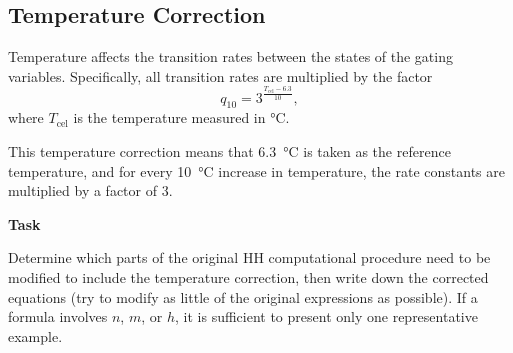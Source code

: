 \documentclass{article}
\begin{document}
\clearpage
\subsection{Temperature Correction}

Temperature affects the transition rates between the states of
the gating variables. Specifically, all transition rates are multiplied
by the factor
\[
q_{10}=3^{\frac{T_{\text{cel}}-6.3}{10}},
\]
where $T_{\text{cel}}$ is the temperature measured in \si{\degreeCelsius}.

This temperature correction means that \SI{6.3}{\degreeCelsius}
is taken as the reference temperature, and for every
\SI{10}{\degreeCelsius} increase in temperature,
the rate constants are multiplied by a factor of 3.

\textbf{Task}

Determine which parts of the original HH computational procedure
need to be modified to include the temperature correction, then write down the corrected equations (try to modify as little of the
original expressions as possible). If a formula involves $n$, $m$,
or $h$, it is sufficient to present only one representative example.

\vspace{2em}
\end{document}
